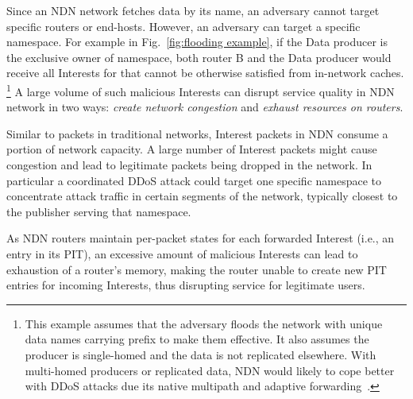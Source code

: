 Since an NDN network fetches data by its name, an adversary cannot target specific routers or end-hosts.
However, an adversary can target a specific namespace.
For example in Fig.~\ref{fig:flooding example}, if the Data producer is the exclusive owner of  namespace, both router B and the Data producer would receive all Interests for  that cannot be otherwise satisfied from in-network caches.%
\footnote {This example assumes that the adversary floods the network with unique data names carrying  prefix to make them effective. It also assumes the producer is single-homed and the data is not replicated elsewhere. With multi-homed producers or replicated data, NDN would likely to cope better with DDoS attacks due its native multipath and adaptive forwarding~\cite{adaptive-forwarding}.}
A large volume of such malicious Interests can disrupt service quality in NDN network in two ways: \emph{create network congestion} and \emph{exhaust resources on routers}.

Similar to packets in traditional networks, Interest packets in NDN consume a portion of network capacity. A large number of Interest packets might cause congestion and lead to legitimate packets being dropped in the network. In particular a coordinated DDoS attack could target one specific namespace to concentrate attack traffic in certain segments of the network, typically closest to the publisher serving that namespace.

As NDN routers maintain per-packet states for each forwarded Interest (i.e., an entry in its PIT), an excessive amount of malicious Interests can lead to exhaustion of a router's memory, making the router unable to create new PIT entries for incoming Interests, thus disrupting service for legitimate users.





